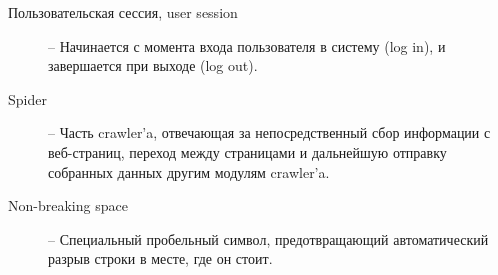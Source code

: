\begin{description}
    \item[Пользовательская сессия, user session] --
           Начинается с момента входа пользователя в систему (log in), и завершается при выходе (log out).

    \item[Spider] --
        Часть crawler'a, отвечающая за непосредственный сбор информации с
        веб-страниц, переход между страницами и дальнейшую отправку собранных
        данных другим модулям crawler'a.

    \item[Non-breaking space] -- 
        Специальный пробельный символ, предотвращающий автоматический разрыв
        строки в месте, где он стоит.

\end{description}

